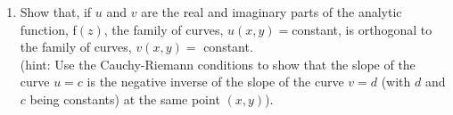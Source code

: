 \documentclass[fleqn]{article}
\begin{document}
\begin{enumerate}

    \item Show that, if $u$ and $v$ are the real and imaginary parts of the analytic function, f$ (z)$,
    the family of curves, $u(x, y) = $constant, is orthogonal to the family of curves, $v(x, y) =$ constant.\\
    (hint: Use the Cauchy-Riemann conditions to show that the slope of the curve $u = c$ is the negative inverse of the slope of the curve $v = d$ (with $d$ and $c$ being constants) at the same point $(x, y)$). 


\end{enumerate}
\end{document}
